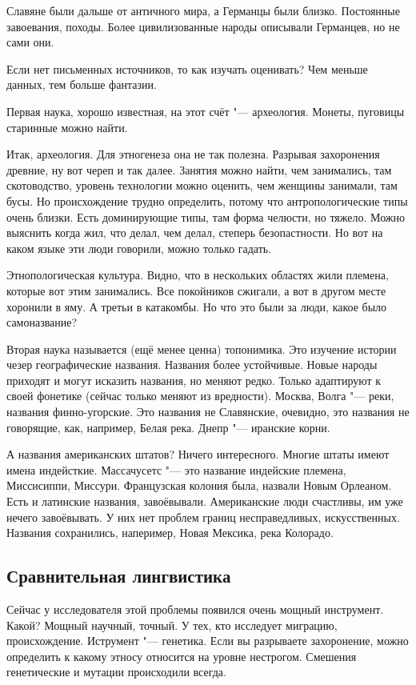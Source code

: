 Славяне были дальше от античного мира, а Германцы были близко. Постоянные завоевания, походы. Более цивилизованные народы описывали Германцев, но не сами они.

Если нет письменных источников, то как изучать оценивать? Чем меньше данных, тем больше фантазии.

Первая наука, хорошо известная, на этот счёт "--- археология. Монеты, пуговицы старинные можно найти. 

Итак, археология. Для этногенеза она не так полезна. Разрывая захоронения древние, ну вот череп и так далее. Занятия можно найти, чем занимались, там скотоводство, уровень технологии можно оценить, чем женщины занимали, там бусы. Но происхождение трудно определить, потому что антропологические типы очень близки. Есть доминирующие типы, там форма челюсти, но тяжело. Можно выяснить когда жил, что делал, чем делал, степерь безопастности. Но вот на каком языке эти люди говорили, можно только гадать.

Этнопологическая культура. Видно, что в нескольких областях жили племена, которые вот этим занимались. Все покойников сжигали, а вот в другом месте хоронили в яму. А третьи в катакомбы. Но что это были за люди, какое было самоназвание?

Вторая наука называется (ещё менее ценна) топонимика. Это изучение истории чезер географические названия. Названия более устойчивые. Новые народы приходят и могут исказить названия, но меняют редко. Только адаптируют к своей фонетике (сейчас только меняют из вредности). Москва, Волга "--- реки, названия финно-угорские. Это названия не Славянские, очевидно, это названия не говорящие, как, например, Белая река. Днепр "--- иранские корни.

А названия американских штатов? Ничего интересного. Многие штаты имеют имена индейсткие. Массачусетс "--- это название индейские племена, Миссисиппи, Миссури. Французская колония была, назвали Новым Орлеаном. Есть и латинские названия, завоёвывали. Американские люди счастливы, им уже нечего завоёвывать. У них нет проблем границ несправедливых, искусственных. Названия сохранились, напеример, Новая Мексика, река Колорадо.

\subsection{Сравнительная лингвистика}
Сейчас у исследователя этой проблемы появился очень мощный инструмент. Какой? Мощный научный, точный. У тех, кто исследует миграцию, происхождение. Иструмент "--- генетика. Если вы разрываете захоронение, можно определить к какому этносу относится на уровне нестрогом. Смешения генетические и мутации происходили всегда.

